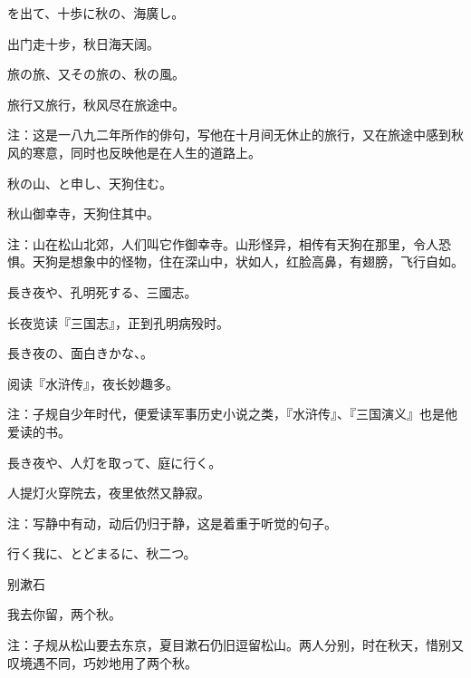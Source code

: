 \begin{haiku}
    {\FH {}を出て、十歩に秋の、海廣し。}

    {\FK 出门走十步，秋日海天阔。}
\end{haiku}

\begin{haiku}
    {\FH 旅の旅、又その旅の、秋の風。}

    {\FK 旅行又旅行，秋风尽在旅途中。}

    {\FT 注：这是一八九二年所作的俳句，写他在十月间无休止的旅行，又在旅途中感到秋风的寒意，同时也反映他是在人生的道路上。}
\end{haiku}

\begin{haiku}
    {\FH 秋の山、と申し、天狗住む。}

    {\FK 秋山御幸寺，天狗住其中。}

    {\FT 注：山在松山北郊，人们叫它作御幸寺。山形怪异，相传有天狗在那里，令人恐惧。天狗是想象中的怪物，住在深山中，状如人，红脸高鼻，有翅膀，飞行自如。}
\end{haiku}

\begin{haiku}
    {\FH 長き夜や、孔明死する、三國志。}

    {\FK 长夜览读『三国志』，正到孔明病殁时。}
\end{haiku}

\begin{haiku}
    {\FH 長き夜の、面白きかな、。}

    {\FK 阅读『水浒传』，夜长妙趣多。}

    {\FT 注：子规自少年时代，便爱读军事历史小说之类，『水浒传』、『三国演义』也是他爱读的书。}
\end{haiku}

\begin{haiku}
    {\FH 長き夜や、人灯を取って、庭に行く。}

    {\FK 人提灯火穿院去，夜里依然又静寂。}

    {\FT 注：写静中有动，动后仍归于静，这是着重于听觉的句子。}
\end{haiku}

\begin{haiku}
    {\FH 行く我に、とどまるに、秋二つ。}

    {\FK 别漱石}

    {\FK 我去你留，两个秋。}

    {\FT 注：子规从松山要去东京，夏目漱石仍旧逗留松山。两人分别，时在秋天，惜别又叹境遇不同，巧妙地用了两个秋。}
\end{haiku}

